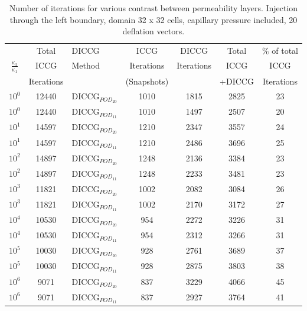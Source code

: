 \documentclass[12pt]{article}
\begin{document}
{\begin{table}[!h]\centering
\begin{minipage}{1\textwidth}
 \centering
\begin{tabular}{ ||c|c||l|c|c|c|c||} 
\hline
&Total& DICCG & ICCG&DICCG &Total&\% of total\\ 
         $\frac{\kappa_2}{\kappa_1}$  & ICCG       & Method & Iterations & Iterations&ICCG& ICCG\\ 
                           &  Iterations&        &  (Snapshots)   & &+DICCG&Iterations \\
\hline  
$10^{0}$ &12440& DICCG$_{POD_{20}}$&1010&1815&2825&23 \\ 
\hline  
$10^{0}$ &12440& DICCG$_{POD_{11}}$&1010&1497&2507&20 \\ 
\hline  
$10^{1}$ &14597& DICCG$_{POD_{20}}$&1210&2347&3557&24 \\ 
\hline  
$10^{1}$ &14597& DICCG$_{POD_{11}}$&1210&2486&3696&25 \\ 
\hline  
$10^{2}$ &14897& DICCG$_{POD_{20}}$&1248&2136&3384&23 \\ 
\hline  
$10^{2}$ &14897& DICCG$_{POD_{11}}$&1248&2233&3481&23 \\ 
\hline  
$10^{3}$ &11821& DICCG$_{POD_{20}}$&1002&2082&3084&26 \\ 
\hline  
$10^{3}$ &11821& DICCG$_{POD_{11}}$&1002&2170&3172&27 \\ 
\hline  
$10^{4}$ &10530& DICCG$_{POD_{20}}$&954&2272&3226&31 \\ 
\hline  
$10^{4}$ &10530& DICCG$_{POD_{11}}$&954&2312&3266&31 \\ 
\hline  
$10^{5}$ &10030& DICCG$_{POD_{20}}$&928&2761&3689&37 \\ 
\hline  
$10^{5}$ &10030& DICCG$_{POD_{11}}$&928&2875&3803&38 \\ 
\hline  
$10^{6}$ &9071& DICCG$_{POD_{20}}$&837&3229&4066&45 \\ 
\hline  
$10^{6}$ &9071& DICCG$_{POD_{11}}$&837&2927&3764&41 \\ 
\hline  
\end{tabular} 
\caption{Number of iterations for various contrast between permeability layers. Injection through the left boundary, domain 32 x 32 cells, capillary pressure included, 20 deflation vectors.}\label{table:liter1a_1} 
\end{minipage}  
\end{table}
\begin{figure}
\hspace{0.3cm}
\begin{minipage}{.4\textwidth}

\end{minipage}
\end{figure}}
\end{document}
